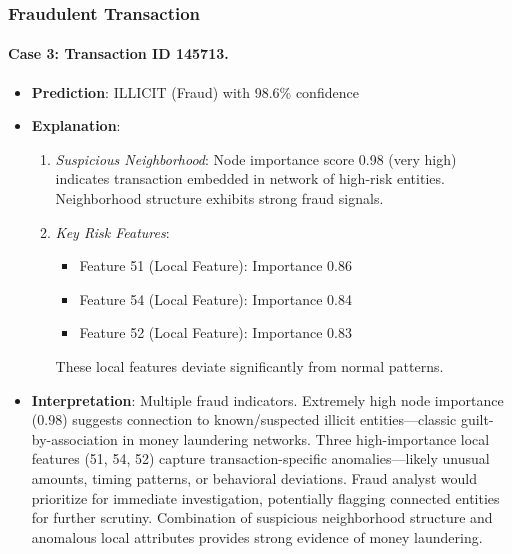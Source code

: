 \subsubsection{Fraudulent Transaction}

\paragraph{Case 3: Transaction ID 145713.}
\begin{itemize}
    \item \textbf{Prediction}: ILLICIT (Fraud) with 98.6\% confidence
    \item \textbf{Explanation}:
    \begin{enumerate}
        \item \textit{Suspicious Neighborhood}: Node importance score 0.98 (very high) indicates transaction embedded in network of high-risk entities. Neighborhood structure exhibits strong fraud signals.
        \item \textit{Key Risk Features}:
        \begin{itemize}
            \item Feature 51 (Local Feature): Importance 0.86
            \item Feature 54 (Local Feature): Importance 0.84  
            \item Feature 52 (Local Feature): Importance 0.83
        \end{itemize}
        These local features deviate significantly from normal patterns.
    \end{enumerate}
    \item \textbf{Interpretation}: Multiple fraud indicators. Extremely high node importance (0.98) suggests connection to known/suspected illicit entities—classic guilt-by-association in money laundering networks. Three high-importance local features (51, 54, 52) capture transaction-specific anomalies—likely unusual amounts, timing patterns, or behavioral deviations. Fraud analyst would prioritize for immediate investigation, potentially flagging connected entities for further scrutiny. Combination of suspicious neighborhood structure and anomalous local attributes provides strong evidence of money laundering.
\end{itemize}

